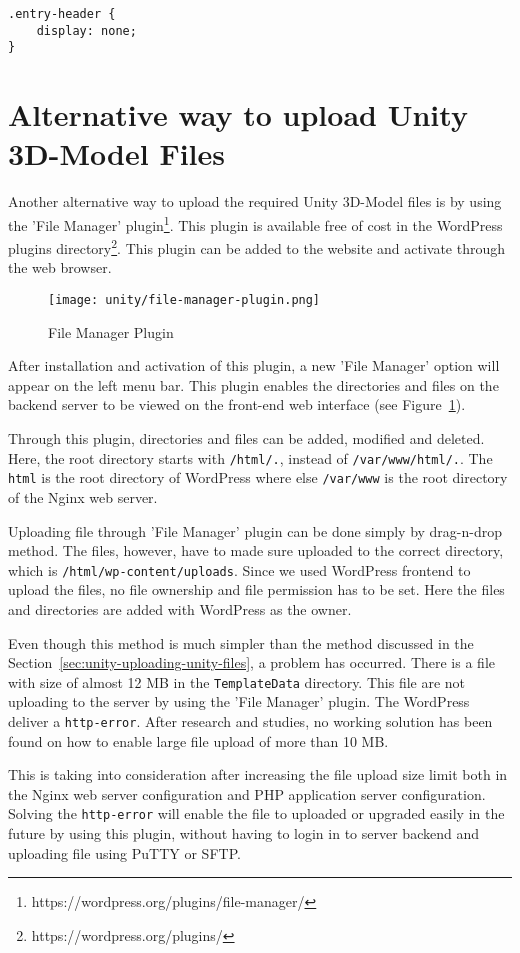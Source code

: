 \begin{lstlisting}
.entry-header {
	display: none;
}
\end{lstlisting}

\section{Alternative way to upload Unity 3D-Model Files}
Another alternative way to upload the required Unity 3D-Model files is by using the 'File Manager' plugin\footnote{https://wordpress.org/plugins/file-manager/}. This plugin is available free of cost in the WordPress plugins directory\footnote{https://wordpress.org/plugins/}. This plugin can be added to the website and activate through the web browser.

\begin{figure}[h]
\caption{File Manager Plugin}
\label{fig:file-manager-screen}
\centering
\texttt{[image: unity/file-manager-plugin.png]}
\end{figure}

After installation and activation of this plugin, a new 'File Manager' option will appear on the left menu bar. This plugin enables the directories and files on the backend server to be viewed on the front-end web interface (see Figure~\ref{fig:file-manager-screen}).

Through this plugin, directories and files can be added, modified and deleted. Here, the root directory starts with \texttt{/html/.}, instead of \texttt{/var/www/html/.}. The \texttt{html} is the root directory of WordPress where else \texttt{/var/www} is the root directory of the Nginx web server.

Uploading file through 'File Manager' plugin can be done simply by drag-n-drop method. The files, however, have to made sure uploaded to the correct directory, which is \texttt{/html/wp-content/uploads}. Since we used WordPress frontend to upload the files, no file ownership and file permission has to be set. Here the files and directories are added with WordPress as the owner.

Even though this method is much simpler than the method discussed in the Section~\ref{sec:unity-uploading-unity-files}, a problem has occurred. There is a file with size of almost 12 MB in the \texttt{TemplateData} directory. This file are not uploading to the server by using the 'File Manager' plugin. The WordPress deliver a \texttt{http-error}. After research and studies, no working solution has been found on how to enable large file upload of more than 10 MB.

This is taking into consideration after increasing the file upload size limit both in the Nginx web server configuration and PHP application server configuration. Solving the \texttt{http-error} will enable the file to uploaded or upgraded easily in the future by using this plugin, without having to login in to server backend and uploading file using PuTTY or SFTP.
